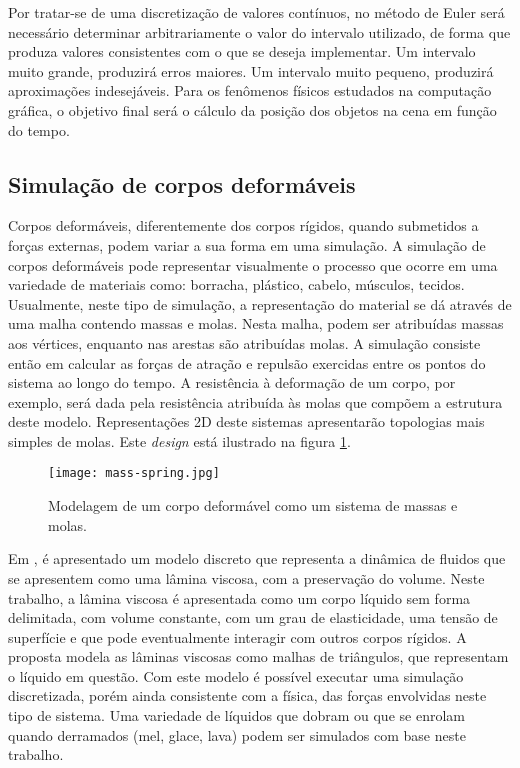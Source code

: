 Por tratar-se de uma discretização de valores contínuos, no método de Euler será necessário determinar arbitrariamente o valor do intervalo utilizado, de forma que produza valores consistentes com o que se deseja implementar. Um intervalo muito grande, produzirá erros maiores. Um intervalo muito pequeno, produzirá aproximações indesejáveis. Para os fenômenos físicos estudados na computação gráfica, o objetivo final será o cálculo da posição dos objetos na cena em função do tempo. 

\subsection{Simulação de corpos deformáveis}

Corpos deformáveis, diferentemente dos corpos rígidos, quando submetidos a forças externas, podem variar a sua forma em uma simulação. A simulação de corpos deformáveis pode representar visualmente o processo que ocorre em uma variedade de materiais como: borracha, plástico, cabelo, músculos, tecidos. Usualmente, neste tipo de simulação, a representação do material se dá através de uma malha contendo massas e molas. Nesta malha, podem ser atribuídas massas aos vértices, enquanto nas arestas são atribuídas molas. A simulação consiste então em calcular as forças de atração e repulsão exercidas entre os pontos do sistema ao longo do tempo. A resistência à deformação de um corpo, por exemplo, será dada pela resistência atribuída às molas que compõem a estrutura deste modelo. Representações 2D deste sistemas apresentarão topologias mais simples de molas. Este \textit{design} está ilustrado na figura \ref{fig:mass-spring}.

\begin{figure}
\begin{center} 
\texttt{[image: mass-spring.jpg]}
\caption{Modelagem de um corpo deformável como um sistema de massas e molas. \cite{gao2006haptic}}
\label{fig:mass-spring}
\end{center} 
\end{figure}

Em \cite{Batty2012}, é apresentado um modelo discreto que representa a dinâmica de fluidos que se apresentem como uma lâmina viscosa, com a preservação do volume. Neste trabalho, a lâmina viscosa é apresentada como um corpo líquido sem forma delimitada, com volume constante, com um grau de elasticidade, uma tensão de superfície e que pode eventualmente interagir com outros corpos rígidos. A proposta modela as lâminas viscosas como malhas de triângulos, que representam o líquido em questão. Com este modelo é possível executar uma simulação discretizada, porém ainda consistente com a física, das forças envolvidas neste tipo de sistema. Uma variedade de líquidos que dobram ou que se enrolam quando derramados (mel, glace, lava) podem ser simulados com base neste trabalho.

